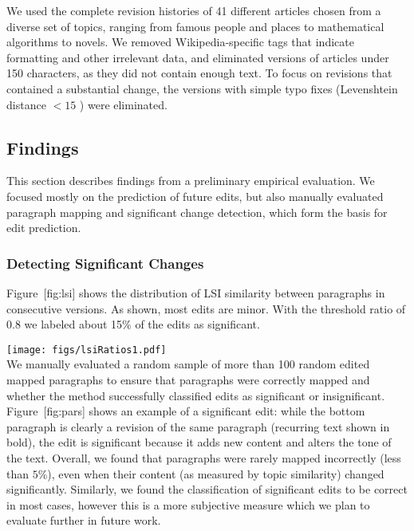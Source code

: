 We used the complete revision histories of 41 different articles chosen
from a diverse set of topics, ranging from famous people and places to
mathematical algorithms to novels. We removed Wikipedia-specific tags
that indicate formatting and other irrelevant data, and eliminated
versions of articles under 150 characters, as they did not contain
enough text. To focus on revisions that contained a substantial change,
the versions with simple typo fixes (Levenshtein distance \(< 15\) )
were eliminated.

\subsection{Findings}\label{findings}

This section describes findings from a preliminary empirical evaluation.
We focused mostly on the prediction of future edits, but also manually
evaluated paragraph mapping and significant change detection, which form
the basis for edit prediction.

\subsubsection{Detecting Significant
Changes}\label{detecting-significant-changes}

Figure~{[}fig:lsi{]} shows the distribution of LSI similarity between
paragraphs in consecutive versions. As shown, most edits are minor. With
the threshold ratio of 0.8 we labeled about 15\% of the edits as
significant.

\texttt{[image: figs/lsiRatios1.pdf]}\\

We manually evaluated a random sample of more than 100 random edited
mapped paragraphs to ensure that paragraphs were correctly mapped and
whether the method successfully classified edits as significant or
insignificant. Figure~{[}fig:pars{]} shows an example of a significant
edit: while the bottom paragraph is clearly a revision of the same
paragraph (recurring text shown in bold), the edit is significant
because it adds new content and alters the tone of the text. Overall, we
found that paragraphs were rarely mapped incorrectly (less than
\(5\%\)), even when their content (as measured by topic similarity)
changed significantly. Similarly, we found the classification of
significant edits to be correct in most cases, however this is a more
subjective measure which we plan to evaluate further in future work.

